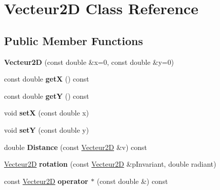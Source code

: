 \hypertarget{class_vecteur2_d}{}\section{Vecteur2D Class Reference}
\label{class_vecteur2_d}
\subsection*{Public Member Functions}
\begin{DoxyCompactItemize}
\item 
\mbox{\label{class_vecteur2_d_ad9dee29de356e9bd4bee597dddf431b0}} 
{\bfseries Vecteur2D} (const double \&x=0, const double \&y=0)
\item 
\mbox{\label{class_vecteur2_d_a7f4eb5a1c2a7c44f3b4821bdff2d2a75}} 
const double {\bfseries getX} () const
\item 
\mbox{\label{class_vecteur2_d_a9765748bf73ae58a67af8edd3ec46cc2}} 
const double {\bfseries getY} () const
\item 
\mbox{\label{class_vecteur2_d_ab5f292c0e0e0a19a21ca5ca3525a4bae}} 
void {\bfseries setX} (const double x)
\item 
\mbox{\label{class_vecteur2_d_a28b427f8a490b14f34d9d05b16e137ad}} 
void {\bfseries setY} (const double y)
\item 
\mbox{\label{class_vecteur2_d_a0a7c32f6cc08bdf023d7544c61966046}} 
double {\bfseries Distance} (const \mbox{\hyperlink{class_vecteur2_d}{Vecteur2D}} \&v) const
\item 
\mbox{\label{class_vecteur2_d_a743966d580825521a71c13bec1a33601}} 
\mbox{\hyperlink{class_vecteur2_d}{Vecteur2D}} {\bfseries rotation} (const \mbox{\hyperlink{class_vecteur2_d}{Vecteur2D}} \&p\+Invariant, double radiant)
\item 
\mbox{\label{class_vecteur2_d_a8f0abbff561e7f8f68bbcdcdf174c2c6}} 
const \mbox{\hyperlink{class_vecteur2_d}{Vecteur2D}} {\bfseries operator $\ast$} (const double \&) const
\item 
\mbox{\label{class_vecteur2_d_ad66f16f464a7c1b7a92cff4d8414b9d6}} 

\end{DoxyCompactItemize}
